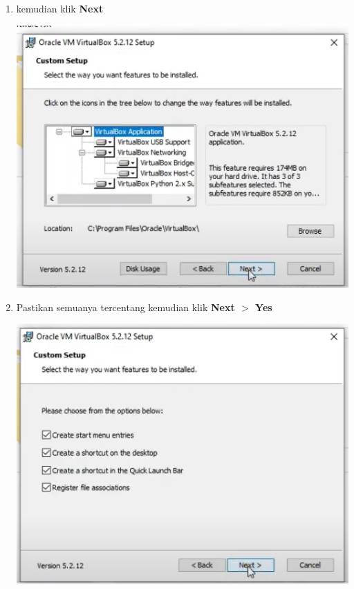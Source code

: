 \documentclass{article}
\begin{document}
\begin{flushleft}
\begin{enumerate}
        	\item kemudian klik \textbf{Next}
        		
        		\begin{center}
        			\includegraphics[scale=0.7]{Screenshot (253)}
        		\end{center}

        		
        	\item Pastikan semuanya tercentang kemudian klik \textbf{Next $>$ Yes}

				\begin{center}
					\includegraphics[scale=0.7]{Screenshot (254)}
				\end{center}
        	

\end{enumerate}
\end{flushleft}
\end{document}

